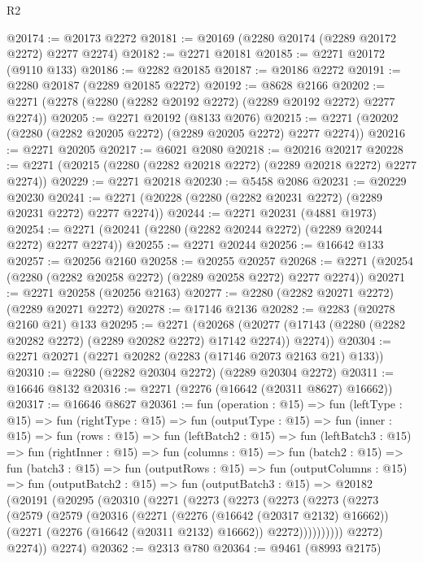 \begin{lexlean}{R2}
\begin{coremodule}
@20174 := @20173 @2272
@20181 := @20169 (@2280 @20174 (@2289 @20172 @2272) @2277 @2274)
@20182 := @2271 @20181
@20185 := @2271 @20172 (@9110 @133)
@20186 := @2282 @20185
@20187 := @20186 @2272
@20191 := @2280 @20187 (@2289 @20185 @2272)
@20192 := @8628 @2166
@20202 := @2271 (@2278 (@2280 (@2282 @20192 @2272) (@2289 @20192 @2272) @2277 @2274))
@20205 := @2271 @20192 (@8133 @2076)
@20215 := @2271 (@20202 (@2280 (@2282 @20205 @2272) (@2289 @20205 @2272) @2277 @2274))
@20216 := @2271 @20205
@20217 := @6021 @2080
@20218 := @20216 @20217
@20228 := @2271 (@20215 (@2280 (@2282 @20218 @2272) (@2289 @20218 @2272) @2277 @2274))
@20229 := @2271 @20218
@20230 := @5458 @2086
@20231 := @20229 @20230
@20241 := @2271 (@20228 (@2280 (@2282 @20231 @2272) (@2289 @20231 @2272) @2277 @2274))
@20244 := @2271 @20231 (@4881 @1973)
@20254 := @2271 (@20241 (@2280 (@2282 @20244 @2272) (@2289 @20244 @2272) @2277 @2274))
@20255 := @2271 @20244
@20256 := @16642 @133
@20257 := @20256 @2160
@20258 := @20255 @20257
@20268 := @2271 (@20254 (@2280 (@2282 @20258 @2272) (@2289 @20258 @2272) @2277 @2274))
@20271 := @2271 @20258 (@20256 @2163)
@20277 := @2280 (@2282 @20271 @2272) (@2289 @20271 @2272)
@20278 := @17146 @2136
@20282 := @2283 (@20278 @2160 @21) @133
@20295 := @2271
    (@20268 (@20277 (@17143 (@2280 (@2282 @20282 @2272) (@2289 @20282 @2272) @17142 @2274)) @2274))
@20304 := @2271 @20271 (@2271 @20282 (@2283 (@17146 @2073 @2163 @21) @133))
@20310 := @2280 (@2282 @20304 @2272) (@2289 @20304 @2272)
@20311 := @16646 @8132
@20316 := @2271 (@2276 (@16642 (@20311 @8627) @16662))
@20317 := @16646 @8627
@20361 := fun (operation : @15) =>
  fun (leftType : @15) =>
  fun (rightType : @15) =>
  fun (outputType : @15) =>
  fun (inner : @15) =>
  fun (rows : @15) =>
  fun (leftBatch2 : @15) =>
  fun (leftBatch3 : @15) =>
  fun (rightInner : @15) =>
  fun (columns : @15) =>
  fun (batch2 : @15) =>
  fun (batch3 : @15) =>
  fun (outputRows : @15) =>
  fun (outputColumns : @15) =>
  fun (outputBatch2 : @15) =>
  fun (outputBatch3 : @15) =>
  @20182
    (@20191
      (@20295
        (@20310
          (@2271
            (@2273
              (@2273
                (@2273
                  (@2273
                    (@2273
                      (@2579
                        (@2579
                          (@20316
                            (@2271
                              (@2276 (@16642 (@20317 @2132) @16662))
                              (@2271 (@2276 (@16642 (@20311 @2132) @16662)) @2272))))))))))
            @2272)
          @2274))
      @2274)
@20362 := @2313 @780
@20364 := @9461 (@8993 @2175)

\end{coremodule}
\end{lexlean}
